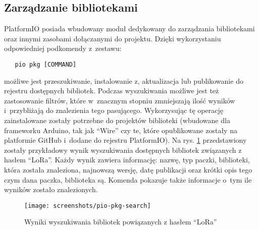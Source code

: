\subsection{Zarządzanie bibliotekami\label{sect:pio-pkg}} PlatformIO posiada wbudowany moduł dedykowany do zarządzania
bibliotekami oraz innymi zasobami dołączanymi do projektu. Dzięki wykorzystaniu odpowiedniej podkomendy z~zestawu:
\begin{verbatim}
   pio pkg [COMMAND]
\end{verbatim}
możliwe jest przeszukiwanie, instalowanie z, aktualizacja lub publikowanie do rejestru dostępnych bibliotek. Podczas
wyszukiwania możliwe jest też zastosowanie filtrów, które w~znacznym stopniu zmniejszają ilość wyników i~przybliżają do
znalezienia tego pasującego. Wykorzysując tę operację zainstalowane zostały potrzebne do projektów biblioteki (wbudowane
dla frameworku Arduino, tak jak \enquote{Wire} czy te, które opublikowane zostały na platformie GitHub i~dodane do
rejestru PlatformIO). Na rys. \ref{img:pio-pkg-search} przedstawiony zostały przykładowy wynik wyszukiwania dostępnych
bibliotek związanych z hasłem \enquote{LoRa}. Każdy wynik zawiera informację: nazwę, typ paczki, biblioteki, która
została znaleziona, najnowszą wersję, datę publikacji oraz krótki opis tego czym dana paczka, biblioteka są. Komenda
pokazuje także informacje o~tym ile wyników zostało znalezionych.

\begin{figure}[h!]
    \centering
    \texttt{[image: screenshots/pio-pkg-search]}
    \caption{\label{img:pio-pkg-search}Wyniki wyszukiwania bibliotek powiązanych z hasłem \enquote{LoRa}}
\end{figure}
